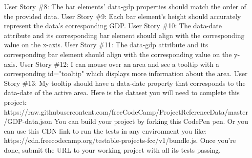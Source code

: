 \documentclass{article}%
\begin{document}
User Story \#8: The bar elements' data{-}gdp properties should match the order of the provided data.\newline%
User Story \#9: Each bar element's height should accurately represent the data's corresponding GDP.\newline%
User Story \#10: The data{-}date attribute and its corresponding bar element should align with the corresponding value on the x{-}axis.\newline%
User Story \#11: The data{-}gdp attribute and its corresponding bar element should align with the corresponding value on the y{-}axis.\newline%
User Story \#12: I can mouse over an area and see a tooltip with a corresponding id="tooltip" which displays more information about the area.\newline%
User Story \#13: My tooltip should have a data{-}date property that corresponds to the data{-}date of the active area.\newline%
Here is the dataset you will need to complete this project: https://raw.githubusercontent.com/freeCodeCamp/ProjectReferenceData/master/GDP{-}data.json\newline%
You can build your project by forking this CodePen pen. Or you can use this CDN link to run the tests in any environment you like: https://cdn.freecodecamp.org/testable{-}projects{-}fcc/v1/bundle.js.\newline%
Once you're done, submit the URL to your working project with all its tests passing.\newline%

%
\end{document}
